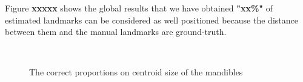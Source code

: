 \documentclass[twoside,twocolumn,10pt]{article}
\begin{document}
Figure \textbf{xxxxx} shows the global results that we have obtained \textbf{"xx\%"} of estimated landmarks can be considered as well positioned because the distance between them and the manual landmarks are ground-truth.\\
\begin{figure}[h]
\centering
{}~~
\caption{The correct proportions on centroid size of the mandibles}
\label{figctresult}
\end{figure}~\\
\end{document}
